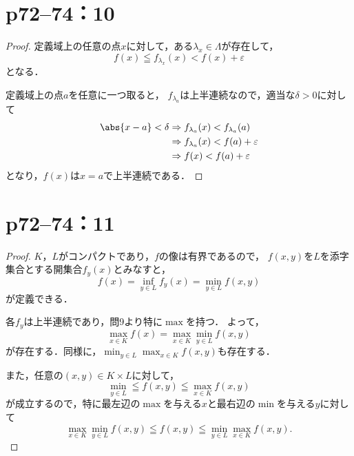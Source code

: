 \documentclass[a4paper,10pt,fleqn]{ltjsarticle}
\begin{document}
\section*{p72--74：10}

\begin{tleftbar}
    \begin{proof}
        定義域上の任意の点$x$に対して，ある$ \lambda_x \in \Lambda$が存在して，
        \[
            f(x) \leqq f_{\lambda_x} (x) < f(x) + \varepsilon
        \]
        となる．

        定義域上の点$a$を任意に一つ取ると，
        $f_{\lambda_a}$は上半連続なので，適当な$\delta >0$に対して
        \begin{align*}
            \abs{x-a}<\delta & \Rightarrow f_{\lambda_a}(x) < f_{\lambda_a}(a)     \\
                             & \Rightarrow  f_{\lambda_a}(x) < f (a) + \varepsilon \\
                             & \Rightarrow f(x) < f(a) + \varepsilon
        \end{align*}
        となり，$f(x)$は$x=a$で上半連続である．
    \end{proof}
\end{tleftbar}


\section*{p72--74：11}

\begin{tleftbar}
    \begin{proof}
        $K$，$L$がコンパクトであり，$f$の像は有界であるので，
        $f(x,y)$を$L$を添字集合とする開集合$f_y (x)$とみなすと，
        \[
            f(x) =\inf_{y \in L} f_y (x)=\min_{y \in L} f(x,y)
        \]
        が定義できる．

        各$f_y$は上半連続であり，問9より特に$\max $を持つ．
        よって，
        \[
            \max_{x \in K} f(x) = \max_{x \in K} \min_{y \in L} f(x,y)
        \]
        が存在する．同様に，$\min_{y \in L} \max_{x \in K} f(x,y)$も存在する．

        また，任意の$(x,y) \in K \times L$に対して，
        \[
            \min_{y \in L} \leqq f(x,y) \leqq \max_{x \in K} f(x,y)
        \]
        が成立するので，特に最左辺の$\max$を与える$x$と最右辺の$\min$を与える$y$に対して
        \[
            \max_{x \in K} \min_{y \in L} f(x,y) \leqq f(x,y) \leqq \min_{y \in L} \max_{x \in K} f(x,y).
        \]
    \end{proof}
\end{tleftbar}
\end{document}
